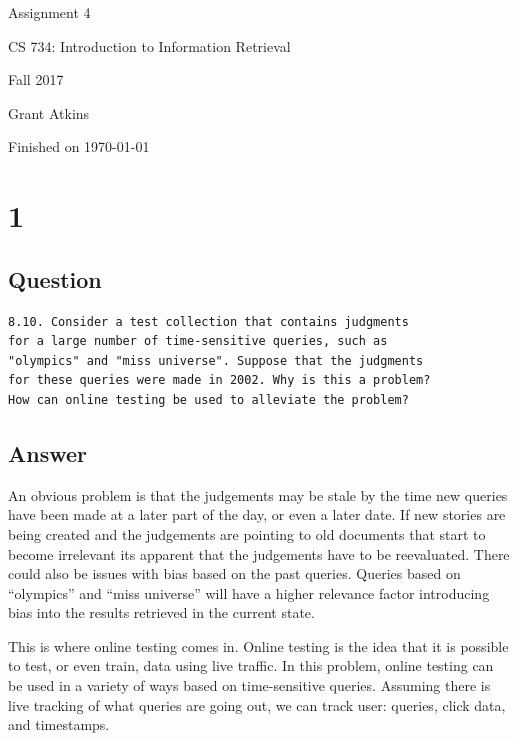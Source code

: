 \documentclass[letterpaper,11pt]{article}
\begin{document}
\begin{titlepage}

\begin{center}

\Huge{Assignment 4}

\Large{CS 734:  Introduction to Information Retrieval}

\Large{Fall 2017}

\Large{Grant Atkins}

\Large Finished on \today

\end{center}

\end{titlepage}

\newpage


\section*{1}

\subsection*{Question}

\begin{verbatim}
8.10. Consider a test collection that contains judgments 
for a large number of time-sensitive queries, such as 
"olympics" and "miss universe". Suppose that the judgments 
for these queries were made in 2002. Why is this a problem? 
How can online testing be used to alleviate the problem?
\end{verbatim}

\subsection*{Answer}

An obvious problem is that the judgements may be stale by the time new queries have been made at a later part of the day, or even a later date.
If new stories are being created and the judgements are pointing to old documents that start to become irrelevant its apparent that the judgements have to be reevaluated.
There could also be issues with bias based on the past queries.
Queries based on ``olympics'' and ``miss universe'' will have a higher relevance factor introducing bias into the results retrieved in the current state.

This is where online testing comes in.
Online testing is the idea that it is possible to test, or even train, data using live traffic.
In this problem, online testing can be used in a variety of ways based on time-sensitive queries.
Assuming there is live tracking of what queries are going out, we can track user: queries, click data, and timestamps.
\end{document}
